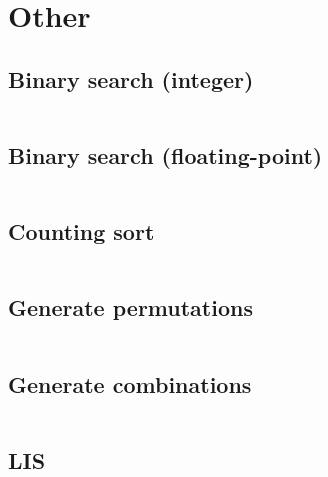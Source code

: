 \section{Other}
\subsection{Binary search (integer)}
\inputminted[frame=single,framesep=3pt,breaklines=true,tabsize=2,linenos,label=O(log(N))]{c++}{other/binary-search-integer.cpp}

\subsection{Binary search (floating-point)}
\inputminted[frame=single,framesep=3pt,breaklines=true,tabsize=2,linenos,label=O(log(N))]{c++}{other/binary-search-float.cpp}

\subsection{Counting sort}
\inputminted[frame=single,framesep=3pt,breaklines=true,tabsize=2,linenos,label=O(N)]{c++}{other/counting-sort.cpp}

\subsection{Generate permutations}
\inputminted[frame=single,framesep=3pt,breaklines=true,tabsize=2,linenos,label=O($N^K$)]{c++}{other/gen-permutations.cpp}

\subsection{Generate combinations}
\inputminted[frame=single,framesep=3pt,breaklines=true,tabsize=2,linenos,label=O($N \binom{N}{K}$)]{c++}{other/gen-combinations.cpp}

\subsection{LIS}
\inputminted[frame=single,framesep=3pt,breaklines=true,tabsize=2,linenos,label=O(N log(N))]{c++}{other/lis.cpp}
